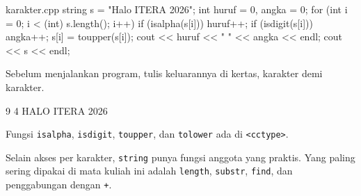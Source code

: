 \documentclass[a4paper]{article}
\begin{document}
\begin{MKode}{karakter.cpp}
string s = "Halo ITERA 2026";
int huruf = 0, angka = 0;
for (int i = 0; i < (int) s.length(); i++) {
    if (isalpha(s[i])) huruf++;
    if (isdigit(s[i])) angka++;
    s[i] = toupper(s[i]);
}
cout << huruf << " " << angka << endl;
cout << s << endl;
\end{MKode}
\begin{Tebak}[]
Sebelum menjalankan program, tulis keluarannya di kertas, karakter demi karakter.
\end{Tebak}
\begin{Jawaban}[]
\begin{MKeluaran}[]
9 4
HALO ITERA 2026
\end{MKeluaran}
Fungsi \texttt{isalpha}, \texttt{isdigit}, \texttt{toupper}, dan \texttt{tolower} ada di \texttt{<cctype>}.
\end{Jawaban}
Selain akses per karakter, \texttt{string} punya fungsi anggota yang praktis. Yang paling sering dipakai di mata kuliah ini adalah \texttt{length}, \texttt{substr}, \texttt{find}, dan penggabungan dengan \texttt{+}.
\end{document}
